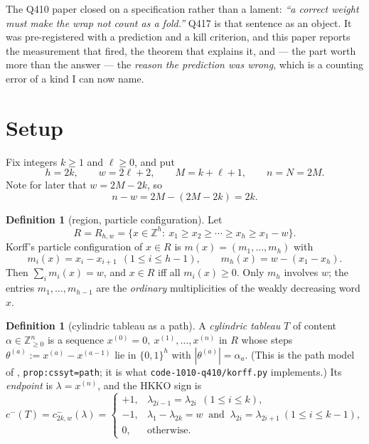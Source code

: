 \documentclass[11pt]{article}
\theoremstyle{plain}
\theoremstyle{definition}
\newtheorem{definition}[theorem]{Definition}
\begin{document}
The Q410 paper closed on a specification rather than a lament: \emph{``a correct weight must make
the wrap not count as a fold.''} Q417 is that sentence as an object. It was pre-registered with a
prediction and a kill criterion, and this paper reports the measurement that fired, the theorem
that explains it, and --- the part worth more than the answer --- the \emph{reason the prediction
was wrong}, which is a counting error of a kind I can now name.

\section{Setup}

Fix integers $k\ge1$ and $\ell\ge0$, and put
\[
h=2k,\qquad w=2\ell+2,\qquad M=k+\ell+1,\qquad n=N=2M .
\]
Note for later that $w=2M-2k$, so
\begin{equation}\label{eq:gap}
n-w = 2M-(2M-2k) = 2k .
\end{equation}

\begin{definition}[region, particle configuration]
Let
\[
R=R_{h,w}=\bigl\{x\in\mathbb{Z}^h:\ x_1\ge x_2\ge\cdots\ge x_h\ge x_1-w\bigr\}.
\]
Korff's particle configuration of $x\in R$ is $m(x)=(m_1,\dots,m_h)$ with
\[
m_i(x)=x_i-x_{i+1}\ \ (1\le i\le h-1),\qquad
m_h(x)=w-(x_1-x_h).
\]
Then $\sum_i m_i(x)=w$, and $x\in R$ iff all $m_i(x)\ge0$. Only $m_h$ involves $w$; the
entries $m_1,\dots,m_{h-1}$ are the \emph{ordinary} multiplicities of the weakly decreasing
word $x$.
\end{definition}

\begin{definition}[cylindric tableau as a path]
A \emph{cylindric tableau} $T$ of content $\alpha\in\mathbb{Z}_{\ge0}^n$ is a sequence
$x^{(0)}=0,\ x^{(1)},\dots,x^{(n)}$ in $R$ whose steps
$\theta^{(a)}:=x^{(a)}-x^{(a-1)}$ lie in $\{0,1\}^h$ with $|\theta^{(a)}|=\alpha_a$.
(This is the path model of \cite{HKKO}, \texttt{prop:cssyt=path}; it is what
\texttt{code-1010-q410/korff.py} implements.) Its \emph{endpoint} is $\lambda=x^{(n)}$, and the
HKKO sign is
\[
c^-(T)=c^-_{2k,w}(\lambda)=
\begin{cases}
+1,& \lambda_{2i-1}=\lambda_{2i}\ \ (1\le i\le k),\\
-1,& \lambda_1-\lambda_{2k}=w\ \text{ and }\ \lambda_{2i}=\lambda_{2i+1}\ (1\le i\le k-1),\\
0,&\text{otherwise.}
\end{cases}
\]
\end{definition}
\end{document}
